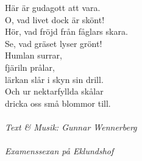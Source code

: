 \vspace{10pt}
Här är gudagott att vara.\\
O, vad livet dock är skönt!\\
Hör, vad fröjd från fåglars skara.\\
Se, vad gräset lyser grönt!\\
Humlan surrar,\\
fjäriln prålar,\\
lärkan slår i skyn sin drill.\\
Och ur nektarfyllda skålar\\
dricka oss små blommor till.\\
\\
  {\footnotesize\textit{Text & Musik: Gunnar Wennerberg\\
      \\
      Examenssexan på Eklundshof}}
